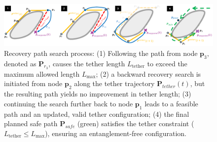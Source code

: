 











\begin{figure}[t!]
    \centering
    \includegraphics[width=\textwidth]{Phd_thesis/figures/planner.pdf}
    \caption{Recovery path search process: 
    (1) Following the path from node \( \mathbf{p}_3 \), denoted as \( \mathbf{P}_{r_3} \), causes the tether length \( L_{\text{tether}} \) to exceed the maximum allowed length \( L_{\text{max}} \); 
    (2) a backward recovery search is initiated from node \( \mathbf{p}_2 \) along the tether trajectory \( \mathbf{P}_{tether}(t) \), but the resulting path yields no improvement in tether length; 
    (3) continuing the search further back to node \( \mathbf{p}_1 \) leads to a feasible path and an updated, valid tether configuration; 
    (4) the final planned safe path \( \mathbf{P}_{safe} \) (green) satisfies the tether constraint (\( L_{\text{tether}} \leq L_{\text{max}} \)), ensuring an entanglement-free configuration.}
    \label{fig:planner_search}
\end{figure}
